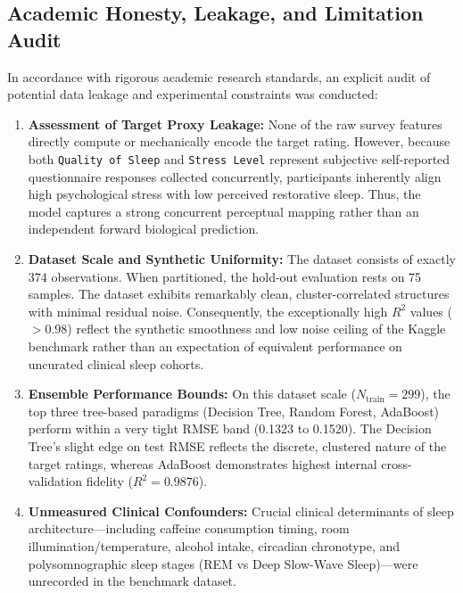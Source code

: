 \documentclass[12pt,a4paper]{article}
\begin{document}
\subsection{Academic Honesty, Leakage, and Limitation Audit}
In accordance with rigorous academic research standards, an explicit audit of potential data leakage and experimental constraints was conducted:
\begin{enumerate}
    \item \textbf{Assessment of Target Proxy Leakage:} None of the raw survey features directly compute or mechanically encode the target rating. However, because both \texttt{Quality of Sleep} and \texttt{Stress Level} represent subjective self-reported questionnaire responses collected concurrently, participants inherently align high psychological stress with low perceived restorative sleep. Thus, the model captures a strong concurrent perceptual mapping rather than an independent forward biological prediction.
    \item \textbf{Dataset Scale and Synthetic Uniformity:} The dataset consists of exactly 374 observations. When partitioned, the hold-out evaluation rests on 75 samples. The dataset exhibits remarkably clean, cluster-correlated structures with minimal residual noise. Consequently, the exceptionally high $R^2$ values ($> 0.98$) reflect the synthetic smoothness and low noise ceiling of the Kaggle benchmark rather than an expectation of equivalent performance on uncurated clinical sleep cohorts.
    \item \textbf{Ensemble Performance Bounds:} On this dataset scale ($N_{\text{train}} = 299$), the top three tree-based paradigms (Decision Tree, Random Forest, AdaBoost) perform within a very tight RMSE band (0.1323 to 0.1520). The Decision Tree's slight edge on test RMSE reflects the discrete, clustered nature of the target ratings, whereas AdaBoost demonstrates highest internal cross-validation fidelity ($R^2 = 0.9876$).
    \item \textbf{Unmeasured Clinical Confounders:} Crucial clinical determinants of sleep architecture---including caffeine consumption timing, room illumination/temperature, alcohol intake, circadian chronotype, and polysomnographic sleep stages (REM vs Deep Slow-Wave Sleep)---were unrecorded in the benchmark dataset.
\end{enumerate}

\end{document}
